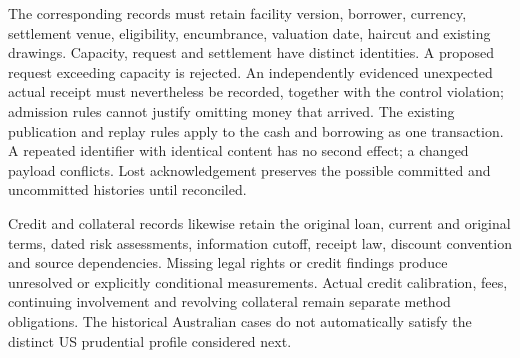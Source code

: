 The corresponding records must retain facility version, borrower, currency,
settlement venue, eligibility, encumbrance, valuation date, haircut and
existing drawings. Capacity, request and settlement have distinct identities.
A proposed request exceeding capacity is rejected. An independently evidenced
unexpected actual receipt must nevertheless be recorded, together with the
control violation; admission rules cannot justify omitting money that arrived.
The existing publication and replay rules apply to the cash and borrowing
as one transaction. A repeated identifier with identical content has no
second effect; a changed payload conflicts. Lost acknowledgement preserves
the possible committed and uncommitted histories until reconciled.

Credit and collateral records likewise retain the original loan, current and
original terms, dated risk assessments, information cutoff, receipt law,
discount convention and source dependencies. Missing legal rights or credit
findings produce unresolved or explicitly conditional measurements. Actual
credit calibration, fees, continuing involvement and revolving collateral
remain separate method obligations. The historical Australian cases do not
automatically satisfy the distinct US prudential profile considered next.
